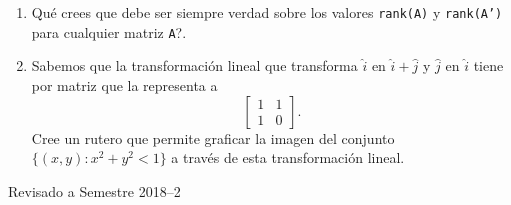 \documentclass[letter,11pt]{article}
\begin{document}
\begin{enumerate}
\item \textquestiondown Qu\'e crees que debe ser siempre verdad sobre los valores \texttt{rank(A)} y \texttt{rank(A')} para cualquier matriz \texttt{A}?.

\item Sabemos que la transformaci\'on lineal que transforma $\hat{i}$ en $\hat{i} + \hat{j}$ y $\hat{j}$ en $\hat{i}$ tiene por matriz que la representa a 
$$
\begin{bmatrix}
1 & 1 \\
1 & 0
\end{bmatrix}.
$$
Cree un rutero que permite graficar la imagen del conjunto $\{(x,y):x^2+y^2<1\}$  a trav\'es de esta transformaci\'on lineal.



\end{enumerate}


\vfill
\hfill Revisado a Semestre 2018--2
\end{document}
